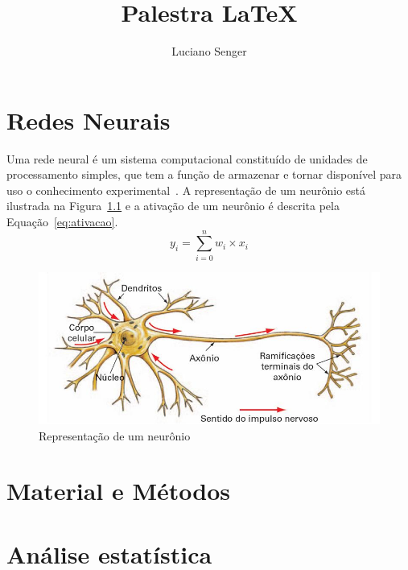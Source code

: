 \documentclass[a4paper, brazil, 12pt , onecolumn]{report}
\title{Palestra \LaTeX}
\author{Luciano Senger}
\begin{document}
	\maketitle
	\tableofcontents
	\listoffigures
	\listoftables
\chapter{Redes Neurais}
Uma rede neural é um sistema computacional constituído de unidades de processamento simples, que tem a função de armazenar e tornar disponível para uso o conhecimento experimental~\cite{haykinredes, LeCun1990}.
A representação de um neurônio está ilustrada na Figura~\ref{fig:neuronio} e a ativação de um neurônio é descrita pela Equação~\ref{eq:ativacao}. 
\begin{equation}
	y_i = \sum_{i=0}^{n} w_i \times x_i
\end{equation}\label{eq:ativacao}

\begin{figure}[htb]
	\centering
	\includegraphics[scale=.3]{neuronio}
	\caption{Representação de um neurônio}\label{fig:neuronio}
\end{figure}
\chapter{Material e Métodos}\label{sec:mat}
\lipsum[3-8]
\lstset{language=Python}




\printindex
\appendix
\chapter{Análise estatística}
\lipsum[3-5]


\end{document}
